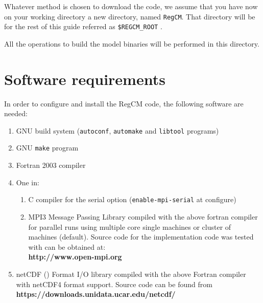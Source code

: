 
Whatever method is chosen to download the code, we assume that you have now
on your working directory a new directory, named \verb=RegCM=.
That directory will be for the rest of this guide referred as 
\verb=$REGCM_ROOT= .

All the operations to build the model binaries will be performed in this
directory.

\section{Software requirements}

In order to configure and install the RegCM code, the following software are
needed:

\begin{enumerate}
    \item GNU build system (\verb=autoconf=, \verb=automake= and
        \verb=libtool= programs)
    \item GNU \verb=make= program
    \item Fortran 2003 compiler
    \item One in:
  \begin{enumerate}
    \item C compiler for the serial option (\verb=enable-mpi-serial= at
      configure)
    \item MPI3 Message Passing Library compiled with the above fortran compiler
     for parallel runs using multiple core single machines or cluster of
     machines (default).  Source code for the implementation code was tested
     with can be obtained at: \\
     {\bf http://www.open-mpi.org}
  \end{enumerate}
\item netCDF (\cite{Rew_90}) Format I/O library compiled with the above
  Fortran compiler with netCDF4 format support. Source code can be found from \\
  {\bf https://downloads.unidata.ucar.edu/netcdf/} \\
\end{enumerate}

